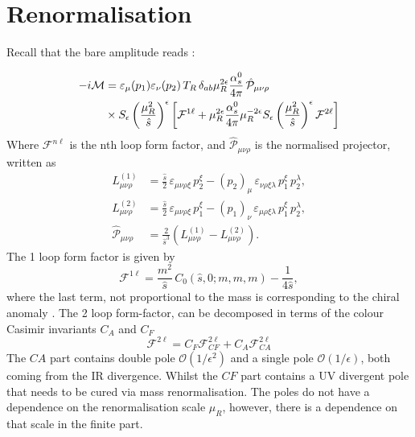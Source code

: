 \section{ Renormalisation}

Recall that the bare amplitude  reads :

\begin{align}
	-i \mathcal{M} &=  \varepsilon_\mu(p_1) \varepsilon_\nu(p_2)  \,T_R\, \delta_{ab}  \mu_R^{2\epsilon} \frac{\alpha_s^0}{4 \pi}\,  \hat{\mathcal P}_{\mu\nu\rho} \nonumber \\
	& \times S_{\epsilon} \left( \frac{\mu^2_R}{\hat s} \right) ^\epsilon \left[   \mathcal F ^{1 \ell} + \mu_R^{2\epsilon} \frac{\alpha_s^0}{4 \pi} \mu_R^{-2\epsilon} S_{\epsilon} \left( \frac{\mu^2_R}{\hat s} \right) ^\epsilon  \mathcal F ^{2 \ell}  \right]
\end{align}
Where $ \mathcal F^{n\ell}$ is the nth loop form factor, and $\hat{\mathcal P}_{\mu\nu\rho} $ is the normalised projector, written as
\begin{align}
	L^{(1)}_{\mu\nu\rho}  &=  \frac{\hat s}{2} \, \varepsilon_{\mu\nu\rho \xi} \, p_2^\xi -( p_2)_\mu\, \varepsilon_{\nu\rho \xi \lambda } \, p_1^\xi\, p_2 ^\lambda,  \nonumber \\
	L^{(2)}_{\mu\nu\rho}  &= \frac{\hat s}{2} \, \varepsilon_{\mu\nu\rho \xi} \, p_1^\xi -( p_1)_\nu\, \varepsilon_{\mu\rho \xi \lambda } \, p_1^\xi\, p_2 ^\lambda,  \nonumber \\
	\hat{\mathcal P}_{\mu\nu\rho}  &=  \frac{2}{\hat s^3} \left( 	L^{(1)}_{\mu\nu\rho} - 	L^{(2)}_{\mu\nu\rho}\right) .
\end{align}
The 1 loop form factor is given by
\begin{equation}
	\mathcal F ^{1 \ell}  = \frac{m^2}{\hat s} \, C_0(\hat s,0; m,m,m) - \frac{1}{4 \hat s},
\end{equation}
where the last term, not proportional to the mass is corresponding to  the chiral anomaly .
The 2 loop form-factor, can be decomposed in terms of the colour Casimir invariants $ C_A$ and $ C_F$
\begin{equation}
	\mathcal F ^{2 \ell}   = C_F \mathcal F_{CF} ^{2 \ell}  + C_A \mathcal F_{CA} ^{2 \ell}
\end{equation}
The $CA$ part contains double pole $ \mathcal O( 1/\epsilon^2) $  and a single pole $ \mathcal O( 1/\epsilon) $, both  coming from the IR divergence. Whilst the $CF$ part contains a UV divergent pole that needs to be cured via mass renormalisation. The poles do not have a dependence on the renormalisation scale $ \mu_R$, however, there is a dependence on that scale in the finite part.
